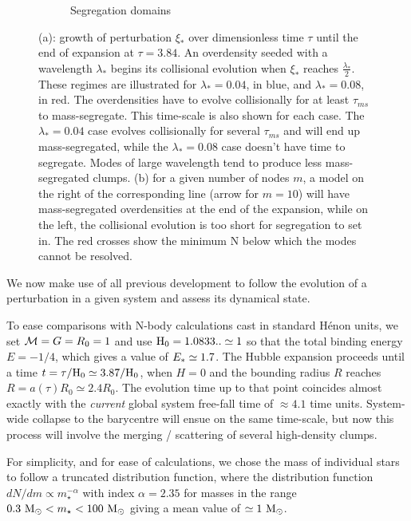 \begin{figure}
\begin{subfigure}[b]{0.49\textwidth}
        \caption{Segregation domains}
        \label{Fig:1_segregation_zone}
    \end{subfigure}
\caption[Growth of idealized perturbation and segregation domains of N and $\Hub_0$]{(a): growth of perturbation $\xi_*$ over dimensionless time $\tau$ until the end of expansion at $\tau = 3.84$. An overdensity seeded with a wavelength $\lambda_*$ begins its collisional evolution when $\xi_*$ reaches $\frac{\lambda_*}{2}$. These regimes are illustrated for $\lambda_* =0.04$, in blue, and  $\lambda_* =0.08$, in red. The overdensities have to evolve collisionally for at least $\tau_{ms}$ to mass-segregate. This time-scale is also shown for each case. The $\lambda_* =0.04$  case evolves collisionally for several $\tau_{ms}$ and will end up mass-segregated, while the $\lambda_* =0.08$ case doesn't have time to segregate. Modes of large wavelength tend to produce less mass-segregated clumps. (b) for a given number of nodes $m$, a model on the right of the corresponding line (arrow for $m=10$) will have mass-segregated overdensities at the end of the expansion, while on the left, the collisional evolution is too short for segregation to set in. The red crosses show the minimum N below which the modes cannot be resolved.} 
\label{Fig:0_perturbation_growth}
\end{figure}


We now make use of all previous development to follow the evolution of a perturbation in a given system and assess its dynamical state.

To ease comparisons with N-body calculations cast in standard H\'enon units, we set ${\cal M} = G = R_0 = 1 $ and use ${\textrm{H}}_0 = 1.0833 .. \simeq 1$ so that the total binding energy $E = -1/4$, which gives a value of $E_\ast \simeq 1.7$. The Hubble expansion proceeds until a time $t = \tau / {\textrm{H}}_0 \simeq 3.87 / {\textrm{H}}_0$, when $H = 0$ and the bounding radius $R$ reaches $R = a(\tau)R_0 \simeq 2.4 R_0$. The evolution time up to that point coincides almost exactly with the {\it current} global system free-fall time of $\approx 4.1$ time units. System-wide collapse to the barycentre will ensue on the same time-scale, but now this process will involve the merging / scattering of several high-density clumps. 

For simplicity, and for ease of calculations, we chose the mass of individual stars to follow a  truncated \cite{Salpeter1955} distribution function, where the distribution function $ dN/dm \propto m_\star^{-\alpha}$ with index $\alpha = 2.35$ for masses in the range  $0.3~{\textrm{M}_\odot} < m_\star < 100 ~{\textrm{M}_\odot}$ giving a mean value of $\simeq 1 ~{\textrm{M}_\odot}$.


